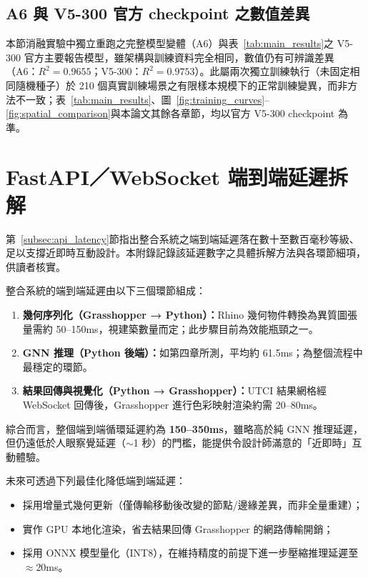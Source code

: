\subsection{A6 與 V5-300 官方 checkpoint 之數值差異}

本節消融實驗中獨立重跑之完整模型變體（A6）與表~\ref{tab:main_results}之 V5-300 官方主要報告模型，雖架構與訓練資料完全相同，數值仍有可辨識差異（A6：$R^2=0.9655$；V5-300：$R^2=0.9753$）。此屬兩次獨立訓練執行（未固定相同隨機種子）於 210 個真實訓練場景之有限樣本規模下的正常訓練變異，而非方法不一致；表~\ref{tab:main_results}、圖~\ref{fig:training_curves}--\ref{fig:spatial_comparison}與本論文其餘各章節，均以官方 V5-300 checkpoint 為準。


\section{FastAPI／WebSocket 端到端延遲拆解}
\label{appx:latency_breakdown}

第~\ref{subsec:api_latency}節指出整合系統之端到端延遲落在數十至數百毫秒等級、足以支撐近即時互動設計。本附錄記錄該延遲數字之具體拆解方法與各環節細項，供讀者核實。

整合系統的端到端延遲由以下三個環節組成：

\begin{enumerate}
    \item \textbf{幾何序列化（Grasshopper → Python）：}Rhino 幾何物件轉換為異質圖張量需約 50--150ms，視建築數量而定；此步驟目前為效能瓶頸之一。
    \item \textbf{GNN 推理（Python 後端）：}如第四章所測，平均約 61.5ms；為整個流程中最穩定的環節。
    \item \textbf{結果回傳與視覺化（Python → Grasshopper）：}UTCI 結果網格經 WebSocket 回傳後，Grasshopper 進行色彩映射渲染約需 20--80ms。
\end{enumerate}

綜合而言，整個端到端循環延遲約為 \textbf{150--350ms}，雖略高於純 GNN 推理延遲，但仍遠低於人眼察覺延遲（$\sim$1 秒）的門檻，能提供令設計師滿意的「近即時」互動體驗。

未來可透過下列最佳化降低端到端延遲：
\begin{itemize}
    \item 採用增量式幾何更新（僅傳輸移動後改變的節點/邊緣差異，而非全量重建）；
    \item 實作 GPU 本地化渲染，省去結果回傳 Grasshopper 的網路傳輸開銷；
    \item 採用 ONNX 模型量化（INT8），在維持精度的前提下進一步壓縮推理延遲至 $\approx$20ms。
\end{itemize}
